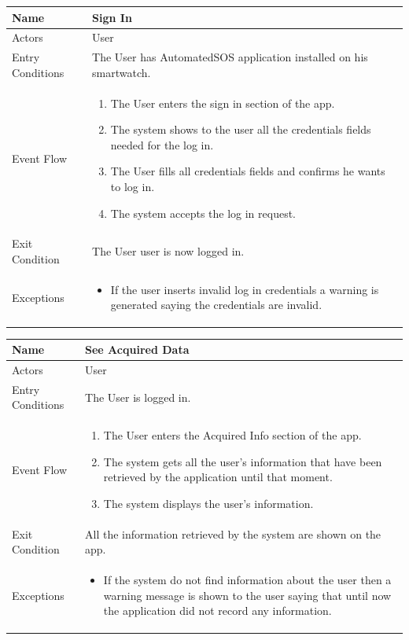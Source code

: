\begin{enumerate}
\FloatBarrier
\begin{table}[h]
\begin{tabular}{|l|p{}|}
\hline
Name             & Sign In \\ \hline
Actors           & User  \\ \hline
Entry Conditions & The User has AutomatedSOS application installed on his smartwatch.    \\ \hline
Event Flow       & \begin{enumerate}
			\item The User enters the sign in section of the app.
            \item The system shows to the user all the credentials fields needed for the log in.
            \item The User fills all credentials fields and confirms he wants to log in.             
            \item The system accepts the log in request.
        \end{enumerate}\\ \hline
Exit Condition   & The User user is now logged in.\\ \hline
Exceptions       & \begin{itemize}
\item If the user inserts invalid log in credentials a warning is generated saying the credentials are invalid.
\end{itemize}\\ \hline
\end{tabular}
\end{table}
\FloatBarrier

\FloatBarrier
\begin{table}[h]
\begin{tabular}{|l|p{}|}
\hline
Name             & See Acquired Data \\ \hline
Actors           & User  \\ \hline
Entry Conditions & The User is logged in. \\ \hline
Event Flow       & \begin{enumerate}
            \item The User enters the Acquired Info section of the app.
            \item The system gets all the user's information that have been retrieved by the application until that moment.
            \item The system displays the user's information.
\end{enumerate}\\ \hline
Exit Condition   & All the information retrieved by the system are shown on the app.\\ \hline
Exceptions       & \begin{itemize}
\item If the system do not find information about the user then a warning message is shown to the user saying that until now the application did not record any information.
\end{itemize}  \\ \hline
\end{tabular}
\end{table}
\FloatBarrier


\end{enumerate}
